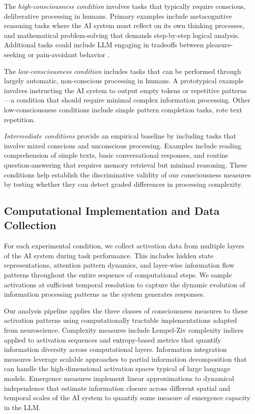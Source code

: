 \documentclass[11pt,a4paper]{article}
\begin{document}
The \textit{high-consciousness condition} involves tasks that typically require conscious, deliberative processing in humans. Primary examples include metacognitive reasoning tasks where the AI system must reflect on its own thinking processes, and mathematical problem-solving that demands step-by-step logical analysis. Additional tasks could include LLM engaging in tradeoffs between pleasure-seeking or pain-avoidant behavior \citep{keeling2024can}.

The \textit{low-consciousness condition} includes tasks that can be performed through largely automatic, non-conscious processing in humans. A prototypical example involves instructing the AI system to output empty tokens or repetitive patterns—a condition that should require minimal complex information processing. Other low-consciousness conditions include simple pattern completion tasks, rote text repetition.

\textit{Intermediate conditions} provide an empirical baseline by including tasks that involve mixed conscious and unconscious processing. Examples include reading comprehension of simple texts, basic conversational responses, and routine question-answering that requires memory retrieval but minimal reasoning. These conditions help establish the discriminative validity of our consciousness measures by testing whether they can detect graded differences in processing complexity.

\subsection{Computational Implementation and Data Collection}

For each experimental condition, we collect activation data from multiple layers of the AI system during task performance. This includes hidden state representations, attention pattern dynamics, and layer-wise information flow patterns throughout the entire sequence of computational steps. We sample activations at sufficient temporal resolution to capture the dynamic evolution of information processing patterns as the system generates responses.

Our analysis pipeline applies the three classes of consciousness measures to these activation patterns using computationally tractable implementations adapted from neuroscience. Complexity measures include Lempel-Ziv complexity indices applied to activation sequences and entropy-based metrics that quantify information diversity across computational layers. Information integration measures leverage scalable approaches to partial information decomposition that can handle the high-dimensional activation spaces typical of large language models. Emergence measures implement linear approximations to dynamical independence that estimate information closure across different spatial and temporal scales of the AI system to quantify some measure of emergence capacity in the LLM.
\end{document}

